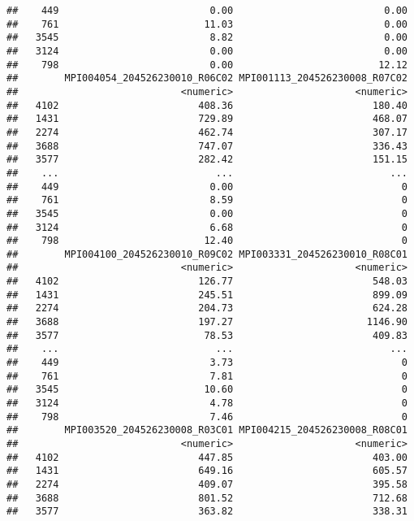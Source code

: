 \documentclass[
]{article}
\begin{document}
\begin{verbatim}
##    449                          0.00                          0.00
##    761                         11.03                          0.00
##   3545                          8.82                          0.00
##   3124                          0.00                          0.00
##    798                          0.00                         12.12
##        MPI004054_204526230010_R06C02 MPI001113_204526230008_R07C02
##                            <numeric>                     <numeric>
##   4102                        408.36                        180.40
##   1431                        729.89                        468.07
##   2274                        462.74                        307.17
##   3688                        747.07                        336.43
##   3577                        282.42                        151.15
##    ...                           ...                           ...
##    449                          0.00                             0
##    761                          8.59                             0
##   3545                          0.00                             0
##   3124                          6.68                             0
##    798                         12.40                             0
##        MPI004100_204526230010_R09C02 MPI003331_204526230010_R08C01
##                            <numeric>                     <numeric>
##   4102                        126.77                        548.03
##   1431                        245.51                        899.09
##   2274                        204.73                        624.28
##   3688                        197.27                       1146.90
##   3577                         78.53                        409.83
##    ...                           ...                           ...
##    449                          3.73                             0
##    761                          7.81                             0
##   3545                         10.60                             0
##   3124                          4.78                             0
##    798                          7.46                             0
##        MPI003520_204526230008_R03C01 MPI004215_204526230008_R08C01
##                            <numeric>                     <numeric>
##   4102                        447.85                        403.00
##   1431                        649.16                        605.57
##   2274                        409.07                        395.58
##   3688                        801.52                        712.68
##   3577                        363.82                        338.31

\end{verbatim}
\end{document}
